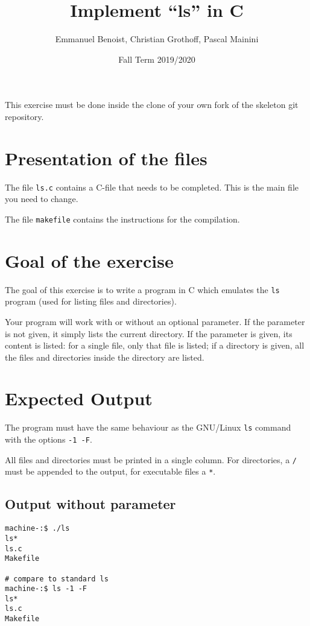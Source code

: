 \documentclass{scrartcl}
\title{Implement \enquote{ls} in C}
\author{Emmanuel Benoist, Christian Grothoff, Pascal Mainini}
\date{Fall Term 2019/2020}
\begin{document}
\maketitle

This exercise must be done inside the clone of your own fork of the skeleton git repository.

\section{Presentation of the files}



The file \texttt{ls.c} contains a C-file that needs to be completed. This is the main file you need to change.

The file \texttt{makefile} contains the instructions for the compilation. 

\section{Goal of the exercise}

The goal of this exercise is to write a program in C which emulates the \texttt{ls} program (used for listing files and directories). 

Your program will work with or without an optional parameter. If the parameter is not given, it simply lists the current directory. If the parameter is given, its content is listed: for a single file, only that file is listed; if a directory is given, all the files and directories inside the directory are listed.

\section{Expected Output}

The program must have the same behaviour as the GNU/Linux \texttt{ls} command with the options \texttt{-1 -F}. 

All files and directories must be printed in a single column. For directories, a \texttt{/} must be appended to the output, for executable files a \texttt{*}.

\subsection{Output without parameter}

\begin{lstlisting}
machine-:$ ./ls
ls*
ls.c
Makefile

# compare to standard ls
machine-:$ ls -1 -F 
ls*
ls.c
Makefile
\end{lstlisting}
\end{document}
